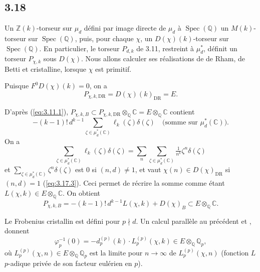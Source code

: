 \documentclass[12pt,a4paper]{article}
\theoremstyle{plain}
\theoremstyle{definition}
\theoremstyle{remark}
\DeclareMathOperator{\Spec}{Spec}
\providecommand{\Spec}{\operatorname{Spec}}
\providecommand{\DR}{\mathrm{DR}}
\begin{document}
\subsection*{3.18}

Un $\mathbb{Z}(k)$-torseur sur $\mu_d$ d\'efini par image directe de $\mu_d$ \`a
$\Spec(\mathbb{Q})$ un $M(k)$-torseur sur $\Spec(\mathbb{Q})$, puis, pour chaque
$\chi$, un $D(\chi)(k)$-torseur sur $\Spec(\mathbb{Q})$. En particulier, le torseur
$P_{d,k}$ de 3.11, restreint \`a $\mu_d^*$, d\'efinit un torseur $P_{\chi,k}$ sous
$D(\chi)$. Nous allons calculer ses r\'ealisations de de Rham, de Betti et cristalline,
lorsque $\chi$ est primitif.

Puisque $F^0 D(\chi)(k) = 0$, on a
\begin{equation}\label{eq:3.18.1}
P_{\chi,k,\DR} = D(\chi)(k)_{\DR} = E.
\end{equation}

D'apr\`es (\ref{eq:3.11.1}), $P_{\chi,k,B} \subset P_{\chi,k,\DR} \otimes_{\mathbb{Q}}
\mathbb{C} = E \otimes_{\mathbb{Q}} \mathbb{C}$ contient
\[
-(k-1)!\, d^{k-1} \sum_{\zeta \in \mu_d^*(\mathbb{C})} \ell_k(\zeta)
\delta(\zeta) \quad \text{(somme sur } \mu_d^*(\mathbb{C})\text{)}.
\]
On a
\[
\sum_{\zeta \in \mu_d^*(\mathbb{C})} \ell_k(\zeta) \delta(\zeta) =
\sum_n \sum_{\zeta \in \mu_d^*(\mathbb{C})} \tfrac{1}{n^k} \zeta^n
\delta(\zeta)
\]
et $\sum_{\zeta \in \mu_d^*(\mathbb{C})} \zeta^n \delta(\zeta)$ est $0$ si
$(n,d) \neq 1$, et vaut $\chi(n) \in D(\chi)_{\DR}$ si $(n,d) = 1$
(\ref{eq:3.17.3}). Ceci permet de r\'ecrire la somme comme \'etant $L(\chi, k) \in E
\otimes_{\mathbb{Q}} \mathbb{C}$. On obtient
\begin{equation}\label{eq:3.18.2}
P_{\chi,k,B} = -(k-1)!\, d^{k-1} L(\chi, k) + D(\chi)_B \subset E \otimes_{\mathbb{Q}}
\mathbb{C}.
\end{equation}

Le Frobenius cristallin est d\'efini pour $p \nmid d$. Un calcul parall\`ele au
pr\'ec\'edent et \cite{C},\cite{Ko} donnent
\begin{equation}\label{eq:3.18.3}
\varphi_p^{-1}(0) = -d_p^{(p)}(k) \cdot L_p^{(p)}(\chi, k) \in E \otimes_{\mathbb{Q}}
\mathbb{Q}_p,
\end{equation}
o\`u $L_p^{(p)}(\chi, n) \in E \otimes_{\mathbb{Q}} \mathbb{Q}_p$ est la limite pour $n \to
\infty$ de $L_p^{(p)}(\chi, n)$ (fonction $L$ $p$-adique priv\'ee de son facteur
eul\'erien en $p$).

\end{document}
